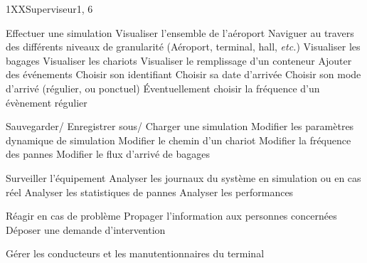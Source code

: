 \phtu
{1}{XX}{Superviseur}{1, 6}
{
	\itm{} Effectuer une simulation
		\sitm{} Visualiser l'ensemble de l'aéroport
			\ssitm{} Naviguer au travers des différents niveaux de granularité (Aéroport, terminal, hall, \textsl{etc.})
			\ssitm{} Visualiser les bagages
			\ssitm{} Visualiser les chariots
			\ssitm{} Visualiser le remplissage d'un conteneur
		\sitm{} Ajouter des événements
			\ssitm{} Choisir son identifiant
			\ssitm{} Choisir sa date d'arrivée
			\ssitm{} Choisir son mode d'arrivé (régulier, ou ponctuel)
			\ssitm{} Éventuellement choisir la fréquence d'un évènement régulier

		\sitm{} Sauvegarder/ Enregistrer sous/ Charger une simulation
		\sitm{} Modifier les paramètres dynamique de simulation
			\ssitm{} Modifier le chemin d'un chariot	
			\ssitm{} Modifier la fréquence des pannes
			\ssitm{} Modifier le flux d'arrivé de bagages

	\itm{} Surveiller l'équipement
		\sitm{} Analyser les journaux du système en simulation ou en cas réel
			\ssitm{} Analyser les statistiques de pannes
			\ssitm{} Analyser les performances

	\itm{} Réagir en cas de problème
		\sitm{} Propager l'information aux personnes concernées
		\sitm{} Déposer une demande d'intervention
		
	\itm{} Gérer les conducteurs et les manutentionnaires du terminal	
}
